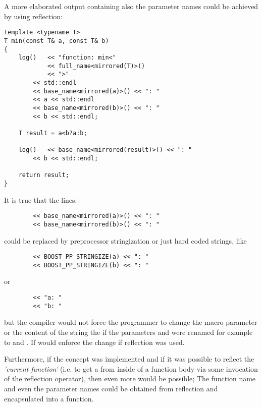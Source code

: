 A more elaborated output containing also the parameter names could be achieved
by using reflection:

\begin{verbatim}
template <typename T>
T min(const T& a, const T& b)
{
	log()   << "function: min<"
	        << full_name<mirrored(T)>()
	        << ">"
		<< std::endl
		<< base_name<mirrored(a)>() << ": "
		<< a << std::endl
		<< base_name<mirrored(b)>() << ": "
		<< b << std::endl;

	T result = a<b?a:b;

	log()   << base_name<mirrored(result)>() << ": "
		<< b << std::endl;

	return result;
}
\end{verbatim}

It is true that the lines:
\begin{verbatim}
		<< base_name<mirrored(a)>() << ": "
		<< base_name<mirrored(b)>() << ": "
\end{verbatim}

could be replaced by preprocessor stringization or just hard coded
strings, like

\begin{verbatim}
		<< BOOST_PP_STRINGIZE(a) << ": "
		<< BOOST_PP_STRINGIZE(b) << ": "
\end{verbatim}

or

\begin{verbatim}
		<< "a: "
		<< "b: "
\end{verbatim}

but the compiler would not force the programmer to change the macro parameter
or the content of the string the if the parameters \verb@a@ and \verb@b@ were renamed
for example to \verb@first@ and \verb@second@. If would enforce the change if
reflection was used.

Furthermore, if the  concept was implemented
and if it was possible to reflect the {\em 'current function'} (i.e. to get a 
from inside of a function body via some invocation of the reflection operator),
then even more would be possible; The function name and even the parameter names could
be obtained from reflection and encapsulated into a function.

